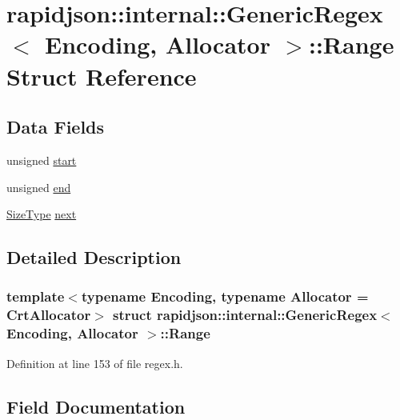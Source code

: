 \hypertarget{structrapidjson_1_1internal_1_1_generic_regex_1_1_range}{}\section{rapidjson\+::internal\+::Generic\+Regex$<$ Encoding, Allocator $>$\+::Range Struct Reference}
\label{structrapidjson_1_1internal_1_1_generic_regex_1_1_range}
\subsection*{Data Fields}
\begin{DoxyCompactItemize}
\item 
unsigned \mbox{\hyperlink{structrapidjson_1_1internal_1_1_generic_regex_1_1_range_a9dedd537843ac66dbef1c87892aa9f7d}{start}}
\item 
unsigned \mbox{\hyperlink{structrapidjson_1_1internal_1_1_generic_regex_1_1_range_a474c70d411511f0104bfeaac2227e0d4}{end}}
\item 
\mbox{\hyperlink{namespacerapidjson_a44eb33eaa523e36d466b1ced64b85c84}{Size\+Type}} \mbox{\hyperlink{structrapidjson_1_1internal_1_1_generic_regex_1_1_range_a1b83a687c40d250e9bcd2aa9910e4b17}{next}}
\end{DoxyCompactItemize}


\subsection{Detailed Description}
\subsubsection*{template$<$typename Encoding, typename Allocator = Crt\+Allocator$>$\newline
struct rapidjson\+::internal\+::\+Generic\+Regex$<$ Encoding, Allocator $>$\+::\+Range}



Definition at line 153 of file regex.\+h.



\subsection{Field Documentation}
\mbox{\label{structrapidjson_1_1internal_1_1_generic_regex_1_1_range_a474c70d411511f0104bfeaac2227e0d4}} 
